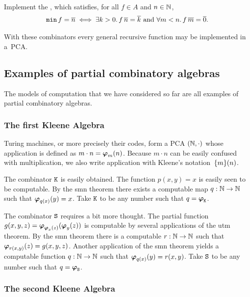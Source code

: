 \begin{exercise}
  Implement the , which satisfies, for all $f \in A$ and $n \in \mathbb{N}$,
  \begin{equation*}
    \mathtt{min} \, f = \overline{n}
    \iff
    \text{$\exists k > 0 .\, f \, \overline{n} = \overline{k}$
          and
          $\forall m < n .\, f \, \overline{m} = \overline{0}$.}
  \end{equation*}
\end{exercise}

With these combinators every general recursive function may be implemented in a~PCA.


\subsection{Examples of partial combinatory algebras}
\label{sec:pca-examples}

The models of computation that we have considered so far are all
examples of partial combinatory algebras.

\subsubsection{The first Kleene Algebra}

Turing machines, or more precisely their codes, form a PCA $(\mathbb{N}, {\cdot})$ whose
application is defined as $m \cdot n = \text{\boldmath{$\varphi$}}_{m}(n)$. Because $m \cdot n$ can be easily
confused with multiplication, we also write application with Kleene's notation~$\{m\}(n)$.

The combinator $\mathtt{K}$ is easily obtained. The function $p(x,y) = x$
is easily seen to be computable. By the smn theorem there exists a
computable map $q : \mathbb{N} \to \mathbb{N}$ such that $\text{\boldmath{$\varphi$}}_{q(x)}(y) = x$. Take
$\mathtt{K}$ to be any number such that $q = \text{\boldmath{$\varphi$}}_{\mathtt{K}}$.

The combinator $\mathtt{S}$ requires a bit more thought. The partial
function $g(x,y,z) = \text{\boldmath{$\varphi$}}_{\text{\boldmath{$\varphi$}}_{x}(z)}(\text{\boldmath{$\varphi$}}_{y}(z))$ is computable
by several applications of the utm theorem. By the smn
theorem there is a computable $r : \mathbb{N} \to \mathbb{N}$ such that
$\text{\boldmath{$\varphi$}}_{r(x,y)}(z) = g(x,y,z)$. Another application of the smn theorem
yields a computable function $q : \mathbb{N} \to \mathbb{N}$ such that $\text{\boldmath{$\varphi$}}_{q(x)}(y)
= r(x,y)$. Take $\mathtt{S}$ to be any number such that $q = \text{\boldmath{$\varphi$}}_{\mathtt{S}}$.

\subsubsection{The second Kleene Algebra}

